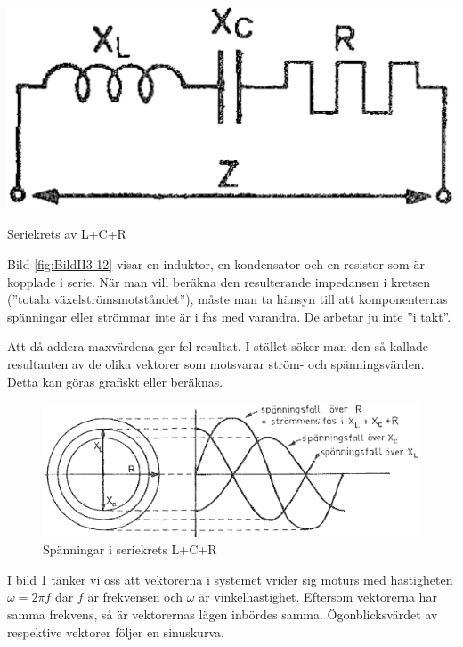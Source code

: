 \begin{marginfigure}%
\includegraphics[width=\textwidth]{images/cropped_pdfs/bild_2_3-12.pdf}
\caption{Seriekrets av L+C+R}
\label{fig:BildII3-12}
\end{marginfigure}

Bild \ref{fig:BildII3-12} visar en induktor, en kondensator och en resistor
som är kopplade i serie.
När man vill beräkna den resulterande impedansen i kretsen
(''totala växelströmsmotståndet''), måste man ta hänsyn till att komponenternas
spänningar eller strömmar inte är i fas med varandra.
De arbetar ju inte ''i takt''.

Att då addera maxvärdena ger fel resultat.
I stället söker man den så kallade resultanten av de olika vektorer som
motsvarar ström- och spänningsvärden.
Detta kan göras grafiskt eller beräknas.

\begin{figure}
\includegraphics[width=\textwidth]{images/cropped_pdfs/bild_2_3-13.pdf}
\caption{Spänningar i seriekrets L+C+R}
\label{fig:BildII3-13}
\end{figure}

I bild \ref{fig:BildII3-13} tänker vi oss att vektorerna i systemet vrider sig 
moturs med hastigheten
\(\omega = 2\pi f\) där \(f\) är frekvensen och \(\omega\) är vinkelhastighet.
Eftersom vektorerna har samma frekvens, så är vektorernas lägen inbördes samma.
Ögonblicksvärdet av respektive vektorer följer en sinuskurva.

